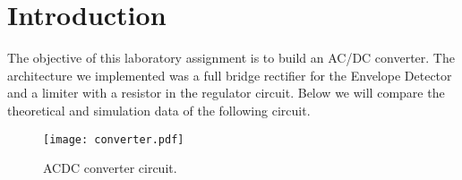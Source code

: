 \section{Introduction}
\label{sec:introduction}
The objective of this laboratory assignment is to build an AC/DC converter. The architecture we implemented was a full bridge rectifier for the Envelope Detector and a limiter with a resistor in the regulator circuit. Below we will compare the theoretical and simulation data of the following circuit.

\begin{figure}[h] \centering
\texttt{[image: converter.pdf]}
\caption{ACDC converter circuit.}
\end{figure}
